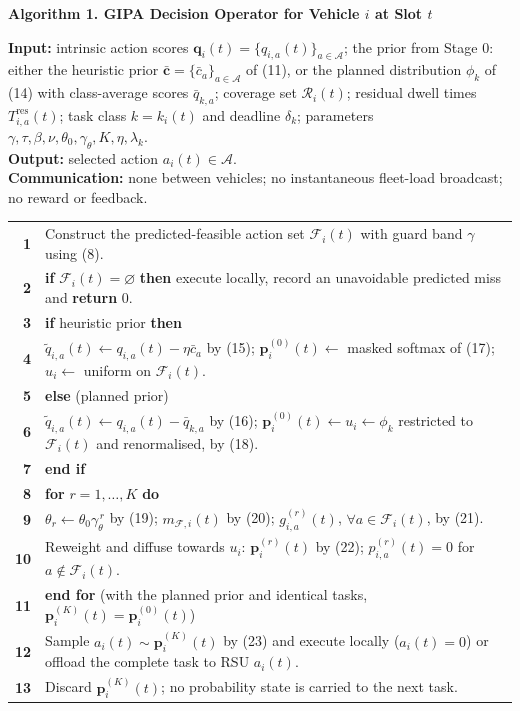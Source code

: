 \documentclass[10pt]{article}
\newcommand{\lnum}[1]{\textbf{#1}}
\begin{document}
\begin{center}
{\large\bfseries Algorithm 1. GIPA Decision Operator for Vehicle $i$ at Slot $t$}
\end{center}
\vspace{-3pt}

{\small
\textbf{Input:}
intrinsic action scores $\mathbf q_i(t)=\{q_{i,a}(t)\}_{a\in\mathcal A}$;
the prior from Stage 0: either the heuristic prior $\bar{\mathbf c}=\{\bar c_a\}_{a\in\mathcal A}$ of (11),
or the planned distribution $\phi_{k}$ of (14) with class-average scores $\bar q_{k,a}$;
coverage set $\mathcal R_i(t)$; residual dwell times $T_{i,a}^{\mathrm{res}}(t)$;
task class $k=k_i(t)$ and deadline $\delta_{k}$;
parameters $\gamma,\tau,\beta,\nu,\theta_0,\gamma_\theta,K,\eta,\lambda_{k}$.\\
\textbf{Output:} selected action $a_i(t)\in\mathcal A$.\\
\textbf{Communication:} none between vehicles; no instantaneous fleet-load broadcast; no reward or feedback.
}

\vspace{4pt}
\small
\begin{tabularx}{\textwidth}{N Y}
\lnum{1} & Construct the predicted-feasible action set $\mathcal F_i(t)$ with guard band $\gamma$ using (8). \\
\lnum{2} & \textbf{if} $\mathcal F_i(t)=\varnothing$ \textbf{then} execute locally, record an unavoidable predicted miss and \textbf{return} $0$. \\
\lnum{3} & \textbf{if} heuristic prior \textbf{then} \\
\lnum{4} & \quad $\widetilde q_{i,a}(t)\gets q_{i,a}(t)-\eta\bar c_a$ by (15); $\mathbf p_i^{(0)}(t)\gets$ masked softmax of (17); $u_i\gets$ uniform on $\mathcal F_i(t)$. \\
\lnum{5} & \textbf{else} \hfill (planned prior) \\
\lnum{6} & \quad $\widetilde q_{i,a}(t)\gets q_{i,a}(t)-\bar q_{k,a}$ by (16); $\mathbf p_i^{(0)}(t)\gets u_i\gets\phi_{k}$ restricted to $\mathcal F_i(t)$ and renormalised, by (18). \\
\lnum{7} & \textbf{end if} \\
\lnum{8} & \textbf{for} $r=1,\ldots,K$ \textbf{do} \\
\lnum{9} & \quad $\theta_r\gets\theta_0\gamma_\theta^{\,r}$ by (19); $m_{\mathcal F,i}(t)$ by (20); $g_{i,a}^{(r)}(t)$, $\forall a\in\mathcal F_i(t)$, by (21). \\
\lnum{10} & \quad Reweight and diffuse towards $u_i$: $\mathbf p_i^{(r)}(t)$ by (22); $p_{i,a}^{(r)}(t)=0$ for $a\notin\mathcal F_i(t)$. \\
\lnum{11} & \textbf{end for} \hfill (with the planned prior and identical tasks, $\mathbf p_i^{(K)}(t)=\mathbf p_i^{(0)}(t)$) \\
\lnum{12} & Sample $a_i(t)\sim\mathbf p_i^{(K)}(t)$ by (23) and execute locally ($a_i(t)=0$) or offload the complete task to RSU $a_i(t)$. \\
\lnum{13} & Discard $\mathbf p_i^{(K)}(t)$; no probability state is carried to the next task. \\
\end{tabularx}
\end{document}
